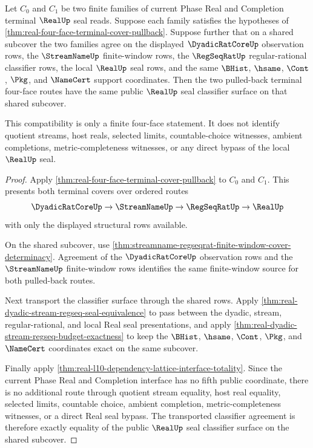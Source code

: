 \begin{theorem}
\label{thm:real-four-face-terminal-cover-overlap-compatibility}
Let $C_0$ and $C_1$ be two finite families of current Phase Real and
Completion terminal $\RealUp$ seal reads. Suppose each family satisfies the
hypotheses of
\autoref{thm:real-four-face-terminal-cover-pullback}. Suppose further that on
a shared subcover the two families agree on the displayed $\DyadicRatCoreUp$
observation rows, the $\StreamNameUp$ finite-window rows, the
$\RegSeqRatUp$ regular-rational classifier rows, the local $\RealUp$ seal
rows, and the same $\BHist$, $\hsame$, $\Cont$, $\Pkg$, and $\NameCert$
support coordinates. Then the two pulled-back terminal four-face routes have
the same public $\RealUp$ seal classifier surface on that shared subcover.

This compatibility is only a finite four-face statement. It does not identify
quotient streams, host reals, selected limits, countable-choice witnesses,
ambient completions, metric-completeness witnesses, or any direct bypass of
the local $\RealUp$ seal.
\end{theorem}
\begin{proof}
Apply \autoref{thm:real-four-face-terminal-cover-pullback} to $C_0$ and
$C_1$. This presents both terminal covers over ordered routes
$$
\DyadicRatCoreUp \to \StreamNameUp \to \RegSeqRatUp \to \RealUp
$$
with only the displayed structural rows available.

On the shared subcover, use
\autoref{thm:streamname-regseqrat-finite-window-cover-determinacy}. Agreement
of the $\DyadicRatCoreUp$ observation rows and the $\StreamNameUp$
finite-window rows identifies the same finite-window source for both
pulled-back routes.

Next transport the classifier surface through the shared rows. Apply
\autoref{thm:real-dyadic-stream-regseq-seal-equivalence} to pass between the
dyadic, stream, regular-rational, and local Real seal presentations, and
apply \autoref{thm:real-dyadic-stream-regseq-budget-exactness} to keep the
$\BHist$, $\hsame$, $\Cont$, $\Pkg$, and $\NameCert$ coordinates exact on the
same subcover.

Finally apply
\autoref{thm:real-l10-dependency-lattice-interface-totality}. Since the
current Phase Real and Completion interface has no fifth public coordinate,
there is no additional route through quotient stream equality, host real
equality, selected limits, countable choice, ambient completion,
metric-completeness witnesses, or a direct Real seal bypass. The transported
classifier agreement is therefore exactly equality of the public $\RealUp$
seal classifier surface on the shared subcover.
\end{proof}

